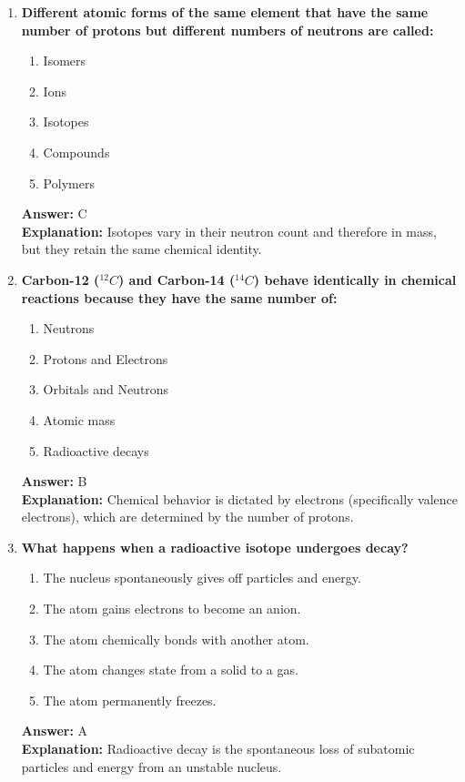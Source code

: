 \documentclass[11pt, a4paper]{article}
\begin{document}
\begin{enumerate}
\item \textbf{Different atomic forms of the same element that have the same number of protons but different numbers of neutrons are called:}
\begin{enumerate}[label=\Alph*.]
    \item Isomers
    \item Ions
    \item Isotopes
    \item Compounds
    \item Polymers
\end{enumerate}
\textbf{Answer:} C \\
\textbf{Explanation:} Isotopes vary in their neutron count and therefore in mass, but they retain the same chemical identity.

\item \textbf{Carbon-12 ($^{12}C$) and Carbon-14 ($^{14}C$) behave identically in chemical reactions because they have the same number of:}
\begin{enumerate}[label=\Alph*.]
    \item Neutrons
    \item Protons and Electrons
    \item Orbitals and Neutrons
    \item Atomic mass
    \item Radioactive decays
\end{enumerate}
\textbf{Answer:} B \\
\textbf{Explanation:} Chemical behavior is dictated by electrons (specifically valence electrons), which are determined by the number of protons.

\item \textbf{What happens when a radioactive isotope undergoes decay?}
\begin{enumerate}[label=\Alph*.]
    \item The nucleus spontaneously gives off particles and energy.
    \item The atom gains electrons to become an anion.
    \item The atom chemically bonds with another atom.
    \item The atom changes state from a solid to a gas.
    \item The atom permanently freezes.
\end{enumerate}
\textbf{Answer:} A \\
\textbf{Explanation:} Radioactive decay is the spontaneous loss of subatomic particles and energy from an unstable nucleus.


\end{enumerate}
\end{document}
